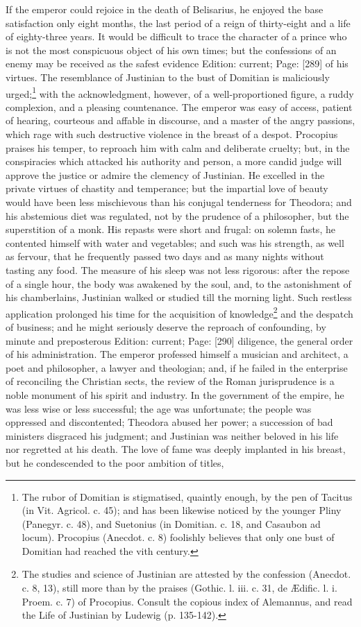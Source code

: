 If the emperor could rejoice in the death of Belisarius, he enjoyed the base satisfaction only eight months, the last period of a reign of thirty-eight and a life of eighty-three years. It would be difficult to trace the character of a prince who is not the most conspicuous object of his own times; but the confessions of an enemy may be received as the safest evidence Edition: current; Page: [289] of his virtues. The resemblance of Justinian to the bust of Domitian is maliciously urged;\footnote{The rubor of Domitian is stigmatised, quaintly enough, by the pen of Tacitus (in Vit. Agricol. c. 45); and has been likewise noticed by the younger Pliny (Panegyr. c. 48), and Suetonius (in Domitian. c. 18, and Casaubon ad locum). Procopius (Anecdot. c. 8) foolishly believes that only one bust of Domitian had reached the vith century.} with the acknowledgment, however, of a well-proportioned figure, a ruddy complexion, and a pleasing countenance. The emperor was easy of access, patient of hearing, courteous and affable in discourse, and a master of the angry passions, which rage with such destructive violence in the breast of a despot. Procopius praises his temper, to reproach him with calm and deliberate cruelty; but, in the conspiracies which attacked his authority and person, a more candid judge will approve the justice or admire the clemency of Justinian. He excelled in the private virtues of chastity and temperance; but the impartial love of beauty would have been less mischievous than his conjugal tenderness for Theodora; and his abstemious diet was regulated, not by the prudence of a philosopher, but the superstition of a monk. His repasts were short and frugal: on solemn fasts, he contented himself with water and vegetables; and such was his strength, as well as fervour, that he frequently passed two days and as many nights without tasting any food. The measure of his sleep was not less rigorous: after the repose of a single hour, the body was awakened by the soul, and, to the astonishment of his chamberlains, Justinian walked or studied till the morning light. Such restless application prolonged his time for the acquisition of knowledge\footnote{The studies and science of Justinian are attested by the confession (Anecdot. c. 8, 13), still more than by the praises (Gothic. l. iii. c. 31, de Ædific. l. i. Proem. c. 7) of Procopius. Consult the copious index of Alemannus, and read the Life of Justinian by Ludewig (p. 135-142).} and the despatch of business; and he might seriously deserve the reproach of confounding, by minute and preposterous Edition: current; Page: [290] diligence, the general order of his administration. The emperor professed himself a musician and architect, a poet and philosopher, a lawyer and theologian; and, if he failed in the enterprise of reconciling the Christian sects, the review of the Roman jurisprudence is a noble monument of his spirit and industry. In the government of the empire, he was less wise or less successful; the age was unfortunate; the people was oppressed and discontented; Theodora abused her power; a succession of bad ministers disgraced his judgment; and Justinian was neither beloved in his life nor regretted at his death. The love of fame was deeply implanted in his breast, but he condescended to the poor ambition of titles, 